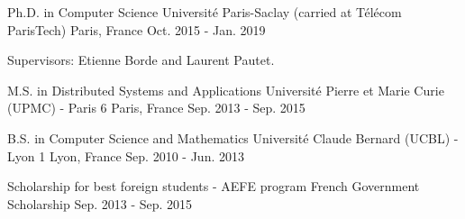 


\begin{cventries}



\cventry
{Ph.D. in Computer Science} %
{Université Paris-Saclay (carried at Télécom ParisTech)} %
{Paris, France} %
{Oct. 2015 - Jan. 2019} %
{ %
	\begin{cvitems}
	\item Supervisors: Etienne Borde and Laurent Pautet.
	\end{cvitems}
}


\cventry
{M.S. in Distributed Systems and Applications} %
{Université Pierre et Marie Curie (UPMC) - Paris 6} %
{Paris, France} %
{Sep. 2013 - Sep. 2015} %
{ %
}


\cventry
{B.S. in Computer Science and Mathematics} %
{Université Claude Bernard (UCBL) - Lyon 1} %
{Lyon, France} %
{Sep. 2010 - Jun. 2013} %
{ %
}


\cventry
{Scholarship for best foreign students - AEFE program} %
{French Government Scholarship} %
{} %
{Sep. 2013 - Sep. 2015} %
{ %
}


\end{cventries}